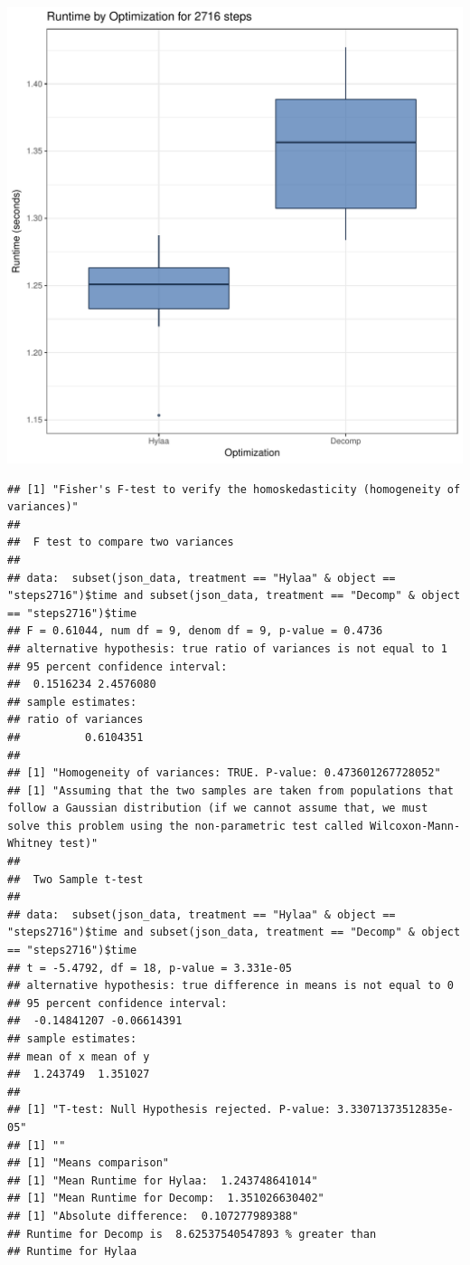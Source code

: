 \documentclass{article}\usepackage[]{graphicx}\usepackage[]{color}
\makeatletter
\def\maxwidth{ %
  \ifdim\Gin@nat@width>\linewidth
    \linewidth
  \else
    \Gin@nat@width
  \fi
}
\newenvironment{kframe}{%
 \def\at@end@of@kframe{}%
 \ifinner\ifhmode%
  \def\at@end@of@kframe{\end{minipage}}%
  \begin{minipage}{\columnwidth}%
 \fi\fi%
 \def\FrameCommand##1{\hskip\@totalleftmargin \hskip-\fboxsep
 \colorbox{shadecolor}{##1}\hskip-\fboxsep
     \hskip-\linewidth \hskip-\@totalleftmargin \hskip\columnwidth}%
 \MakeFramed {\advance\hsize-\width
   \@totalleftmargin\z@ \linewidth\hsize
   \@setminipage}}%
 {\par\unskip\endMakeFramed%
 \at@end@of@kframe}
\newenvironment{knitrout}{}{} %
\makeatother
\begin{document}
\begin{knitrout}
\color{fgcolor}
\includegraphics[width=\maxwidth]{figure/RH2_steps2716-1} 
\begin{kframe}\begin{verbatim}
## [1] "Fisher's F-test to verify the homoskedasticity (homogeneity of variances)"
## 
## 	F test to compare two variances
## 
## data:  subset(json_data, treatment == "Hylaa" & object == "steps2716")$time and subset(json_data, treatment == "Decomp" & object == "steps2716")$time
## F = 0.61044, num df = 9, denom df = 9, p-value = 0.4736
## alternative hypothesis: true ratio of variances is not equal to 1
## 95 percent confidence interval:
##  0.1516234 2.4576080
## sample estimates:
## ratio of variances 
##          0.6104351 
## 
## [1] "Homogeneity of variances: TRUE. P-value: 0.473601267728052"
## [1] "Assuming that the two samples are taken from populations that follow a Gaussian distribution (if we cannot assume that, we must solve this problem using the non-parametric test called Wilcoxon-Mann-Whitney test)"
## 
## 	Two Sample t-test
## 
## data:  subset(json_data, treatment == "Hylaa" & object == "steps2716")$time and subset(json_data, treatment == "Decomp" & object == "steps2716")$time
## t = -5.4792, df = 18, p-value = 3.331e-05
## alternative hypothesis: true difference in means is not equal to 0
## 95 percent confidence interval:
##  -0.14841207 -0.06614391
## sample estimates:
## mean of x mean of y 
##  1.243749  1.351027 
## 
## [1] "T-test: Null Hypothesis rejected. P-value: 3.33071373512835e-05"
## [1] ""
## [1] "Means comparison"
## [1] "Mean Runtime for Hylaa:  1.243748641014"
## [1] "Mean Runtime for Decomp:  1.351026630402"
## [1] "Absolute difference:  0.107277989388"
## Runtime for Decomp is  8.62537540547893 % greater than 
## Runtime for Hylaa
\end{verbatim}
\end{kframe}
\end{knitrout}
\end{document}

